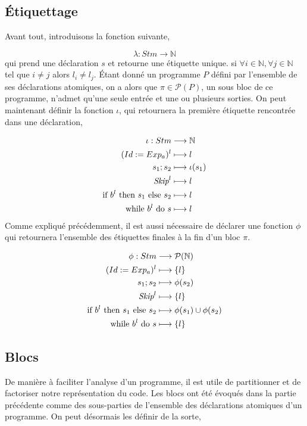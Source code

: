 \documentclass[a4paper, 12pt]{article}
\begin{document}
\subsection{Étiquettage}
Avant tout, introduisons la fonction suivante,

\[
	\lambda: Stm \longrightarrow \mathbb{N}
\]
\newline
qui prend une déclaration $s$ et retourne une étiquette unique.
\newline
\newline
{}
si $\forall i \in \mathbb{N}, \forall j \in \mathbb{N}$ tel que $i \ne j$ alors $l_i \ne l_j$.
\newline
\newline
Étant donné un programme $P$ défini par l'ensemble de ses déclarations atomiques, on a alors que 
$\pi \in \mathcal{P}(P)$, un sous bloc de ce programme, n'admet qu'une seule entrée et une ou plusieurs sorties. 
On peut maintenant définir la fonction $\iota$, qui retournera la première étiquette rencontrée dans une déclaration,

\begin{align*}
	\iota : Stm &\longrightarrow \mathbb{N}\\
	({Id}\space:=\space{Exp_a})^l &\longmapsto l\\
	{s_1}\space;\space{s_2} &\longmapsto \iota(s_1)\\
	{\textit{Skip}}^l &\longmapsto l\\
	\text{if }{b^l}\text{ then }{s_1}\text{ else }{s_2} &\longmapsto l\\
	\text{while }{b^l}\text{ do }{s} &\longmapsto l
\end{align*}
Comme expliqué précédemment, il est aussi nécessaire de déclarer une fonction $\phi$ qui retournera l'ensemble des étiquettes finales 
à la fin d'un bloc $\pi$.

\begin{align*}
	\phi : Stm &\longrightarrow \mathcal{P}(\mathbb{N})\\
	({Id}\space:=\space{Exp_a})^l &\longmapsto \{l\}\\
	{s_1}\space;\space{s_2} &\longmapsto \phi(s_2)\\
	\textit{Skip}^l &\longmapsto \{l\}\\
	\text{if }{b^l}\text{ then }{s_1}\text{ else }{s_2} &\longmapsto \phi(s_1) \cup \phi(s_2)\\
	\text{while }{b^l}\text{ do }{s} &\longmapsto \{l\}
\end{align*}
\subsection{Blocs}
De manière à faciliter l'analyse d'un programme, il est utile de partitionner et de factoriser notre représentation du code. 
Les blocs ont été évoqués dans la partie précédente comme des sous-parties de l'ensemble des déclarations atomiques d'un programme. 
On peut désormais les définir de la sorte,
\end{document}
